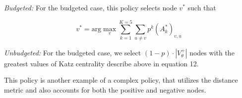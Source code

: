 \textit{Budgeted:}
For the budgeted case, this policy selects node $v^*$ such that

\begin{equation}
v^* = \text{arg} \max_v \sum_{k=1}^{K=5} \sum_{u \neq v} {p}^k (A^*_k)_{v, u}
\end{equation}

\textit{Unbudgeted:}
For the budgeted case, we select $(1-p) \cdot |V_\theta^+|$ nodes with the greatest values of Katz centrality describe above in equation 12.

This policy is another example of a complex policy, that utilizes the distance metric and also accounts for both the positive and negative nodes.

